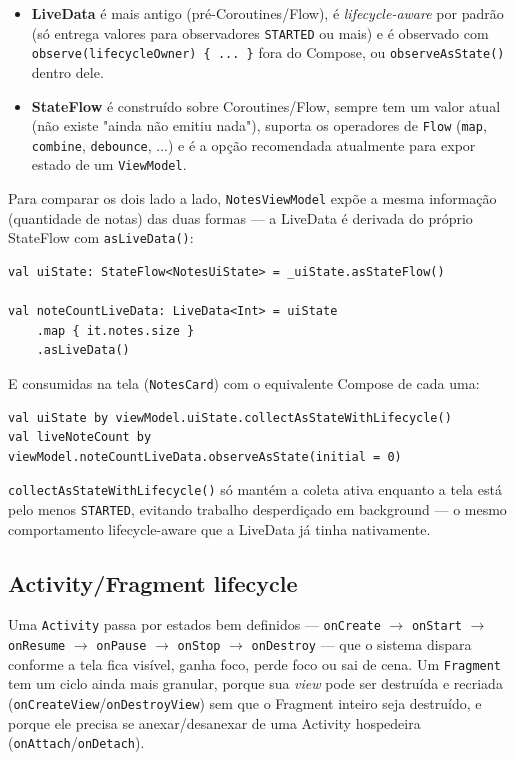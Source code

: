 \documentclass[11pt,a4paper]{article}
\begin{document}
\begin{itemize}
    \item \textbf{LiveData} é mais antigo (pré-Coroutines/Flow), é
    \emph{lifecycle-aware} por padrão (só entrega valores para
    observadores \texttt{STARTED} ou mais) e é observado com
    \texttt{observe(lifecycleOwner) \{ ... \}} fora do Compose, ou
    \texttt{observeAsState()} dentro dele.
    \item \textbf{StateFlow} é construído sobre Coroutines/Flow, sempre
    tem um valor atual (não existe "ainda não emitiu nada"), suporta os
    operadores de \texttt{Flow} (\texttt{map}, \texttt{combine},
    \texttt{debounce}, ...) e é a opção recomendada atualmente para
    expor estado de um \texttt{ViewModel}.
\end{itemize}

Para comparar os dois lado a lado, \texttt{NotesViewModel} expõe a
mesma informação (quantidade de notas) das duas formas — a LiveData é
derivada do próprio StateFlow com \texttt{asLiveData()}:

\begin{lstlisting}[caption={A mesma informacao exposta como StateFlow e como LiveData}, label=lst:stateflow-livedata]
val uiState: StateFlow<NotesUiState> = _uiState.asStateFlow()

val noteCountLiveData: LiveData<Int> = uiState
    .map { it.notes.size }
    .asLiveData()
\end{lstlisting}

E consumidas na tela (\texttt{NotesCard}) com o equivalente Compose de
cada uma:

\begin{lstlisting}[caption={Coletando StateFlow e observando LiveData a partir do Compose}, label=lst:collect-observe]
val uiState by viewModel.uiState.collectAsStateWithLifecycle()
val liveNoteCount by viewModel.noteCountLiveData.observeAsState(initial = 0)
\end{lstlisting}

\texttt{collectAsStateWithLifecycle()} só mantém a coleta ativa enquanto
a tela está pelo menos \texttt{STARTED}, evitando trabalho desperdiçado
em background — o mesmo comportamento lifecycle-aware que a LiveData já
tinha nativamente.

\subsection{Activity/Fragment lifecycle}
\label{sec:lifecycle}

Uma \texttt{Activity} passa por estados bem definidos —
\texttt{onCreate} $\to$ \texttt{onStart} $\to$ \texttt{onResume} $\to$
\texttt{onPause} $\to$ \texttt{onStop} $\to$ \texttt{onDestroy} — que o
sistema dispara conforme a tela fica visível, ganha foco, perde foco ou
sai de cena. Um \texttt{Fragment} tem um ciclo ainda mais granular,
porque sua \emph{view} pode ser destruída e recriada
(\texttt{onCreateView}/\texttt{onDestroyView}) sem que o Fragment
inteiro seja destruído, e porque ele precisa se anexar/desanexar de uma
Activity hospedeira (\texttt{onAttach}/\texttt{onDetach}).
\end{document}
